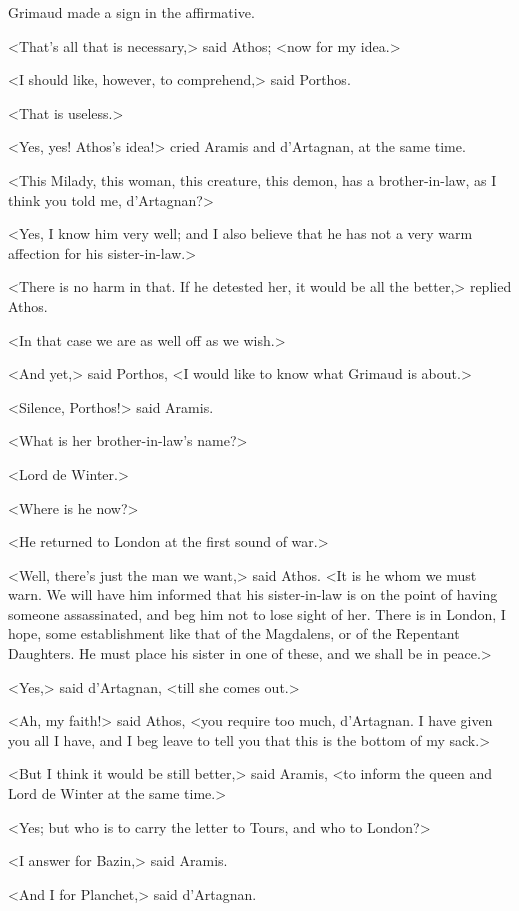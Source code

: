 Grimaud made a sign in the affirmative. 

<That's all that is necessary,> said Athos; <now for my idea.> 

<I should like, however, to comprehend,> said Porthos. 

<That is useless.> 

<Yes, yes! Athos's idea!> cried Aramis and d'Artagnan, at the same time. 

<This Milady, this woman, this creature, this demon, has a brother-in-law, as I think you told me, d'Artagnan?> 

<Yes, I know him very well; and I also believe that he has not a very warm affection for his sister-in-law.> 

<There is no harm in that. If he detested her, it would be all the better,> replied Athos. 

<In that case we are as well off as we wish.> 

<And yet,> said Porthos, <I would like to know what Grimaud is about.> 

<Silence, Porthos!> said Aramis. 

<What is her brother-in-law's name?> 

<Lord de Winter.> 

<Where is he now?> 

<He returned to London at the first sound of war.> 

<Well, there's just the man we want,> said Athos. <It is he whom we must warn. We will have him informed that his sister-in-law is on the point of having someone assassinated, and beg him not to lose sight of her. There is in London, I hope, some establishment like that of the Magdalens, or of the Repentant Daughters. He must place his sister in one of these, and we shall be in peace.> 

<Yes,> said d'Artagnan, <till she comes out.> 

<Ah, my faith!> said Athos, <you require too much, d'Artagnan. I have given you all I have, and I beg leave to tell you that this is the bottom of my sack.> 

<But I think it would be still better,> said Aramis, <to inform the queen and Lord de Winter at the same time.> 

<Yes; but who is to carry the letter to Tours, and who to London?> 

<I answer for Bazin,> said Aramis. 

<And I for Planchet,> said d'Artagnan. 

